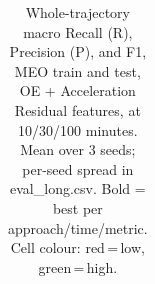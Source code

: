 \begin{table}[t]
{\begin{tabular}{l ccc ccc ccc}
\bottomrule
\end{tabular}%
}
\caption{Whole-trajectory macro Recall (R), Precision (P), and F1, MEO train and test, OE + Acceleration Residual features, at 10/30/100 minutes. Mean over 3 seeds; per-seed spread in eval\_long.csv. Bold = best per approach/time/metric. Cell colour: red\,=\,low, green\,=\,high.}
\label{tab:total_meo_ladder}
\end{table}
